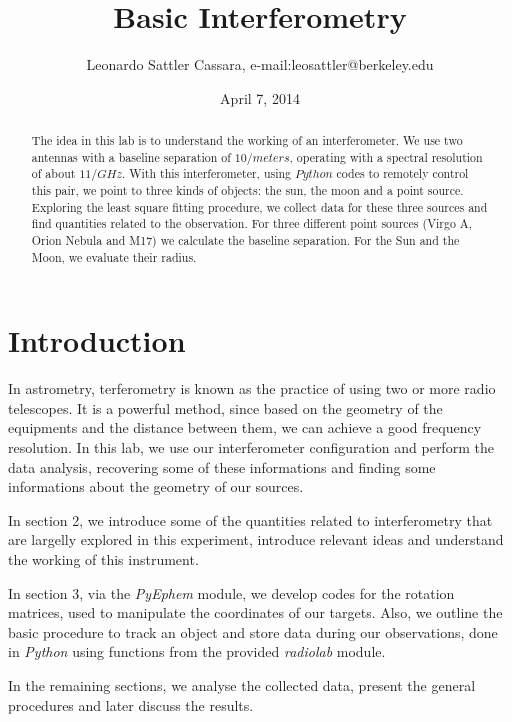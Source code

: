 \documentclass{article}
\begin{document}
\title{Basic Interferometry}
\author{Leonardo Sattler Cassara, e-mail:leosattler@berkeley.edu}
\date{April 7, 2014}
\maketitle

\begin{abstract}

The idea in this lab is to understand the working of an
interferometer. We use two antennas with a baseline separation of $10 /
meters$, operating with a spectral resolution of about $11 / GHz$. With
this interferometer, using $Python$ codes to remotely control this pair,
we point to three kinds of objects: the sun, the moon and a point
source. Exploring the least square fitting procedure, we collect data for
these three sources and find quantities related to the observation. For
three different point sources (Virgo A, Orion Nebula and M17) we calculate
the baseline separation. For the Sun and the Moon, we evaluate their
radius. 

\end{abstract}

\section{Introduction}

In astrometry, terferometry is known as the practice of using two or
more radio telescopes. It is a powerful method, since based on the
geometry of the equipments and the distance between them, we can achieve
a good frequency resolution. In this lab, we use our interferometer
configuration and perform the data analysis, recovering some of these
informations and finding some informations about the geometry of our sources.

In section 2, we introduce some of the quantities related to
interferometry that are largelly explored in this experiment, introduce
relevant ideas and
understand the working of this instrument. 

In section 3, via the \emph{PyEphem} module, we develop codes for the rotation
matrices, used to manipulate the coordinates of our targets. Also, we
outline the basic procedure to track an object and store data during our
observations, done in \emph{Python} using functions from the provided
\emph{radiolab} module.

In the remaining sections, we analyse the collected data, present the
general procedures and later discuss the results. 
\end{document}
